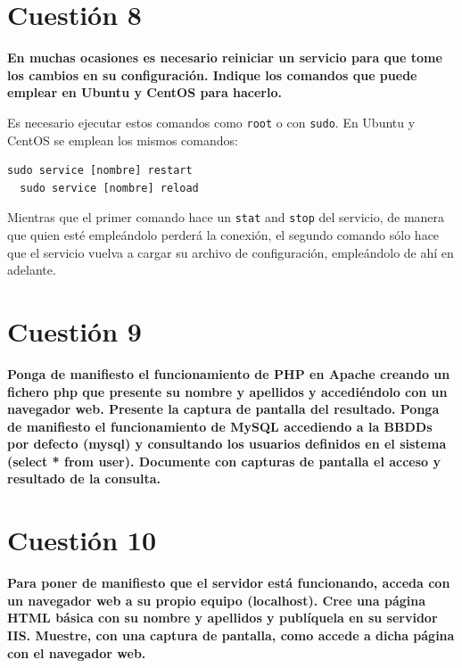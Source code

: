 \documentclass[a4paper,11pt]{article}
\newenvironment{answer}{%
\begin{list}{}{%
}%
\item[]}{\end{list}}
\begin{document}
\section{Cuestión 8}
\textbf{En muchas ocasiones es necesario reiniciar un servicio para que tome los cambios en su configuración. Indique los 
comandos que puede emplear en Ubuntu y CentOS para hacerlo.}
\begin{answer}
  Es necesario ejecutar estos comandos como \texttt{root} o con \texttt{sudo}.
  En Ubuntu y CentOS se emplean los mismos comandos:
  \begin{lstlisting}[style=BashInputStyle]
  sudo service [nombre] restart
  sudo service [nombre] reload
  \end{lstlisting}

  Mientras que el primer comando hace un \texttt{stat} and \texttt{stop} del servicio,
  de manera que quien esté empleándolo perderá la conexión, el segundo comando sólo
  hace que el servicio vuelva a cargar su archivo de configuración, empleándolo de
  ahí en adelante.
  
  \cite{diffre}
\end{answer}

\section{Cuestión 9}
\textbf{Ponga de manifiesto el funcionamiento de PHP en Apache creando un fichero php que presente su nombre y apellidos 
y accediéndolo con un navegador web. Presente la captura de pantalla del resultado. Ponga de manifiesto el funcionamiento
de MySQL accediendo a la BBDDs por defecto (mysql) y consultando los usuarios definidos en el sistema (select * from user). 
Documente con capturas de pantalla el acceso y resultado de la consulta.}
\begin{answer}
  
\end{answer}

\section{Cuestión 10}
\textbf{Para poner de manifiesto que el servidor está funcionando, acceda con un navegador web a su propio equipo 
(localhost). Cree una página HTML básica con su nombre y apellidos y publíquela en su servidor IIS. Muestre, con una 
captura de pantalla, como accede a dicha página con el navegador web.}
\begin{answer}
  
\end{answer}
\end{document}

